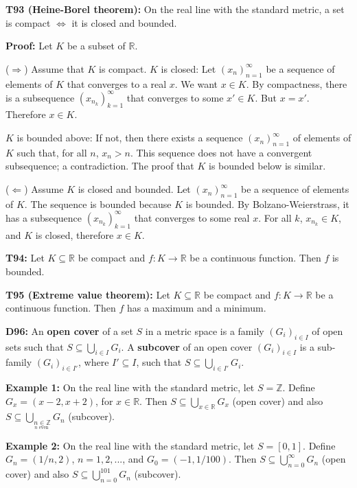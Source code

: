 \documentclass[twocolumn,10pt]{article}
\begin{document}
\textbf{T93 (Heine-Borel theorem):} On the real line with the standard metric, a set is compact $\Leftrightarrow$ it is closed and bounded.

\color{red}
\textbf{Proof:} Let $K$ be a subset of $\mathbb{R}$.

($\Rightarrow$) Assume that $K$ is compact. $K$ is closed: Let $(x_n)_{n=1}^{\infty}$ be a sequence of elements of $K$ that converges to a real $x$. We want $x\in K$. By compactness, there is a subsequence $(x_{n_k})_{k=1}^{\infty}$ that converges to some $x'\in K$. But $x=x'$. Therefore $x\in K$.

$K$ is bounded above: If not, then there exists a sequence $(x_n)_{n=1}^{\infty}$ of elements of $K$ such that, for all $n$, $x_n>n$. This sequence does not have a convergent subsequence; a contradiction. The proof that $K$ is bounded below is similar.

($\Leftarrow$) Assume $K$ is closed and bounded. Let $(x_n)_{n=1}^{\infty}$ be a sequence of elements of $K$. The sequence is bounded because $K$ is bounded. By Bolzano-Weierstrass, it has a subsequence $(x_{n_k})_{k=1}^{\infty}$ that converges to some real $x$. For all $k$, $x_{n_k}\in K$, and $K$ is closed, therefore $x\in K$.
\color{black}

\textbf{T94:} Let $K\subseteq\mathbb{R}$ be compact and $f:K\to\mathbb{R}$ be a continuous function. Then $f$ is bounded.

\textbf{T95 (Extreme value theorem):} Let $K\subseteq\mathbb{R}$ be compact and $f:K\to\mathbb{R}$ be a continuous function. Then $f$ has a maximum and a minimum.

\textbf{D96:} An \textbf{open cover} of a set $S$ in a metric space is a family $(G_i)_{i\in I}$ of open sets such that $S\subseteq\bigcup_{i\in I}G_i$. A \textbf{subcover} of an open cover $(G_i)_{i\in I}$ is a sub-family $(G_i)_{i\in I'}$, where $I'\subseteq I$, such that $S\subseteq\bigcup_{i\in I'}G_i$.

\color{red}
\textbf{Example 1:} On the real line with the standard metric, let $S=\mathbb{Z}$. Define $G_x=(x-2,x+2)$, for $x\in\mathbb{R}$. Then $S\subseteq\bigcup_{x\in\mathbb{R}}G_x$ (open cover) and also $S\subseteq\bigcup_{\underset{n\text{ even }}{n\in\mathbb{Z}}}G_n$ (subcover).

\textbf{Example 2:} On the real line with the standard metric, let $S=[0,1]$. Define $G_n=(1/n,2)$, $n=1,2,...$, and $G_0=(-1,1/100)$. Then $S\subseteq\bigcup_{n=0}^{\infty}G_n$ (open cover) and also $S\subseteq\bigcup_{n=0}^{101}G_n$ (subcover).
\color{black}
\end{document}
